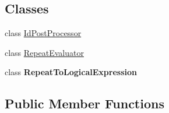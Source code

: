 \subsection*{Classes}
\begin{DoxyCompactItemize}
\item 
class \hyperlink{classit_1_1emarolab_1_1cagg_1_1core_1_1language_1_1syntax_1_1expressionTree_1_1expressionNodeTypee265c5385dc11a583b6493cfac9b7ab}{Id\-Post\-Processor}
\item 
class \hyperlink{classit_1_1emarolab_1_1cagg_1_1core_1_1language_1_1syntax_1_1expressionTree_1_1expressionNodeTyp785488d13bbbabc8bec5d8852bfc23de}{Repeat\-Evaluator}
\item 
class {\bfseries Repeat\-To\-Logical\-Expression}
\end{DoxyCompactItemize}
\subsection*{Public Member Functions}

